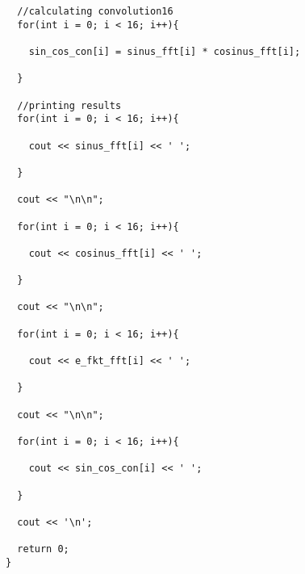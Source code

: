 \documentclass[11pt]{article}
\begin{document}
\begin{lstlisting}
  //calculating convolution16
  for(int i = 0; i < 16; i++){

    sin_cos_con[i] = sinus_fft[i] * cosinus_fft[i];

  }
 
  //printing results
  for(int i = 0; i < 16; i++){

    cout << sinus_fft[i] << ' ';

  }

  cout << "\n\n";

  for(int i = 0; i < 16; i++){

    cout << cosinus_fft[i] << ' ';

  }

  cout << "\n\n";

  for(int i = 0; i < 16; i++){

    cout << e_fkt_fft[i] << ' ';

  }
   
  cout << "\n\n";

  for(int i = 0; i < 16; i++){

    cout << sin_cos_con[i] << ' ';

  }

  cout << '\n';
  
  return 0;
}

\end{lstlisting}
\end{document}
